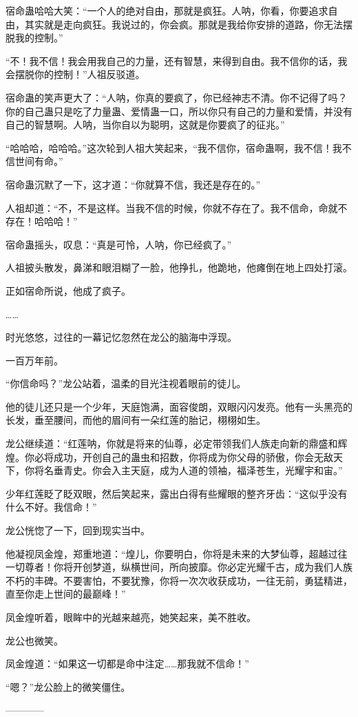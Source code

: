 \begin{this_body}
宿命蛊哈哈大笑：“一个人的绝对自由，那就是疯狂。人呐，你看，你要追求自由，其实就是走向疯狂。我说过的，你会疯。那就是我给你安排的道路，你无法摆脱我的控制。”

“不！我不信！我会用我自己的力量，还有智慧，来得到自由。我不信你的话，我会摆脱你的控制！”人祖反驳道。

宿命蛊的笑声更大了：“人呐，你真的要疯了，你已经神志不清。你不记得了吗？你的自己蛊只是吃了力量蛊、爱情蛊一口，所以你只有自己的力量和爱情，并没有自己的智慧啊。人呐，当你自以为聪明，这就是你要疯了的征兆。”

“哈哈哈，哈哈哈。”这次轮到人祖大笑起来，“我不信你，宿命蛊啊，我不信！我不信世间有命。”

宿命蛊沉默了一下，这才道：“你就算不信，我还是存在的。”

人祖却道：“不，不是这样。当我不信的时候，你就不存在了。我不信命，命就不存在！哈哈哈！”

宿命蛊摇头，叹息：“真是可怜，人呐，你已经疯了。”

人祖披头散发，鼻涕和眼泪糊了一脸，他挣扎，他跪地，他瘫倒在地上四处打滚。

正如宿命所说，他成了疯子。

……

时光悠悠，过往的一幕记忆忽然在龙公的脑海中浮现。

一百万年前。

“你信命吗？”龙公站着，温柔的目光注视着眼前的徒儿。

他的徒儿还只是一个少年，天庭饱满，面容俊朗，双眼闪闪发亮。他有一头黑亮的长发，垂至腰间，而他的眉间有一朵红莲的胎记，栩栩如生。

龙公继续道：“红莲呐，你就是将来的仙尊，必定带领我们人族走向新的鼎盛和辉煌。你必将成功，开创自己的蛊虫和招数，你将成为你父母的骄傲，你会无敌天下，你将名垂青史。你会入主天庭，成为人道的领袖，福泽苍生，光耀宇和宙。”

少年红莲眨了眨双眼，然后笑起来，露出白得有些耀眼的整齐牙齿：“这似乎没有什么不好。我信命！”

龙公恍惚了一下，回到现实当中。

他凝视凤金煌，郑重地道：“煌儿，你要明白，你将是未来的大梦仙尊，超越过往一切尊者！你将开创梦道，纵横世间，所向披靡。你必定光耀千古，成为我们人族不朽的丰碑。不要害怕，不要犹豫，你将一次次收获成功，一往无前，勇猛精进，直至你走上世间的最巅峰！”

凤金煌听着，眼眸中的光越来越亮，她笑起来，美不胜收。

龙公也微笑。

凤金煌道：“如果这一切都是命中注定……那我就不信命！”

“嗯？”龙公脸上的微笑僵住。

------------

\end{this_body}


